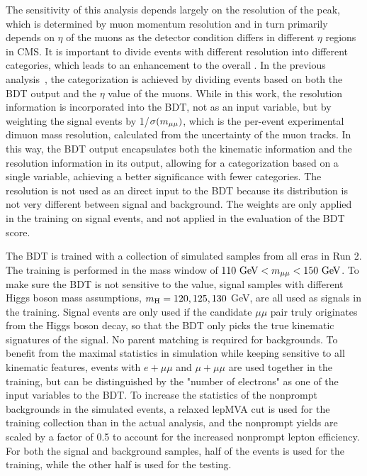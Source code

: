 The sensitivity of this analysis depends largely on the resolution of the \mmm peak, which is determined by muon momentum resolution
and in turn primarily depends on $\eta$ of the muons as the detector condition differs in different $\eta$ regions in CMS.
It is important to divide events with different resolution into different categories, which leads to an enhancement to the overall \SoB.
In the previous \hmm analysis~\cite{PhysRevLett.122.021801, carnesthesis}, the categorization is achieved by dividing events based on 
both the BDT output and the $\eta$ value of the muons.  
While in this work, the resolution information is incorporated into the BDT, not as an input variable, but by weighting the signal events by 1/$\sigma(m_{\mu\mu})$,
which is the per-event experimental dimuon mass resolution, calculated from the \pt uncertainty of the muon tracks.
In this way, the BDT output encapsulates both the kinematic information and the resolution information in its output, 
allowing for a categorization based on a single variable, achieving a better significance with fewer categories.
The resolution is not used as an direct input to the BDT because its distribution is not very different between signal and background.
The weights are only applied in the training on signal events, and not applied in the evaluation of the BDT score.

The BDT is trained with a collection of simulated samples from all eras in Run 2.  
The training is performed in the mass window of $110 ~\mbox{GeV}{} < m_{\mu\mu} < 150 ~\mbox{GeV}{}$.  
To make sure the BDT is not sensitive to the \mmm value, signal samples with different Higgs boson mass assumptions, 
$m_{\mathrm{H}} = 120, 125, 130$ GeV, are all used as signals in the training.  
Signal events are only used if the candidate $\mu\mu$ pair truly originates from the Higgs boson decay, 
so that the BDT only picks the true kinematic signatures of the signal. No parent matching is required for backgrounds.   
To benefit from the maximal statistics in simulation while keeping sensitive to all kinematic features, 
events with $e+\mu\mu$ and $\mu+\mu\mu$ are used together in the training, but can be distinguished 
by the "number of electrons" as one of the input variables to the BDT.  
To increase the statistics of the nonprompt backgrounds in the simulated events, 
a relaxed lepMVA cut is used for the training collection than in the actual analysis, 
and the nonprompt yields are scaled by a factor of 0.5 to account for the increased nonprompt lepton efficiency.  
For both the signal and background samples, half of the events is used for the training, 
while the other half is used for the testing.

